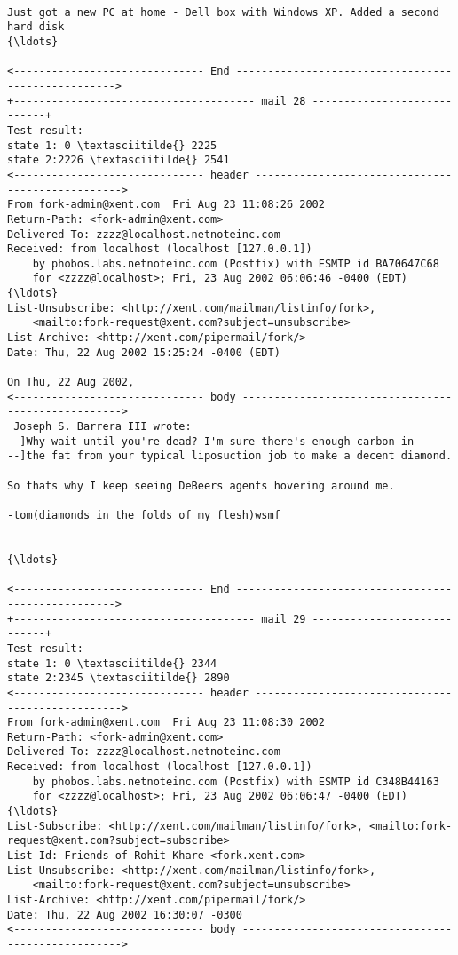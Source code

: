 \documentclass[11pt]{article}
\begin{document}
\begin{Verbatim}[commandchars=\\\{\}]
 
Just got a new PC at home - Dell box with Windows XP. Added a second hard disk
{\ldots}

<------------------------------ End --------------------------------------------------->
+-------------------------------------- mail 28 ----------------------------+
Test result:
state 1: 0 \textasciitilde{} 2225
state 2:2226 \textasciitilde{} 2541
<------------------------------ header ------------------------------------------------->
From fork-admin@xent.com  Fri Aug 23 11:08:26 2002
Return-Path: <fork-admin@xent.com>
Delivered-To: zzzz@localhost.netnoteinc.com
Received: from localhost (localhost [127.0.0.1])
	by phobos.labs.netnoteinc.com (Postfix) with ESMTP id BA70647C68
	for <zzzz@localhost>; Fri, 23 Aug 2002 06:06:46 -0400 (EDT)
{\ldots}
List-Unsubscribe: <http://xent.com/mailman/listinfo/fork>,
    <mailto:fork-request@xent.com?subject=unsubscribe>
List-Archive: <http://xent.com/pipermail/fork/>
Date: Thu, 22 Aug 2002 15:25:24 -0400 (EDT)

On Thu, 22 Aug 2002,
<------------------------------ body --------------------------------------------------->
 Joseph S. Barrera III wrote:
--]Why wait until you're dead? I'm sure there's enough carbon in
--]the fat from your typical liposuction job to make a decent diamond.

So thats why I keep seeing DeBeers agents hovering around me.

-tom(diamonds in the folds of my flesh)wsmf


{\ldots}

<------------------------------ End --------------------------------------------------->
+-------------------------------------- mail 29 ----------------------------+
Test result:
state 1: 0 \textasciitilde{} 2344
state 2:2345 \textasciitilde{} 2890
<------------------------------ header ------------------------------------------------->
From fork-admin@xent.com  Fri Aug 23 11:08:30 2002
Return-Path: <fork-admin@xent.com>
Delivered-To: zzzz@localhost.netnoteinc.com
Received: from localhost (localhost [127.0.0.1])
	by phobos.labs.netnoteinc.com (Postfix) with ESMTP id C348B44163
	for <zzzz@localhost>; Fri, 23 Aug 2002 06:06:47 -0400 (EDT)
{\ldots}
List-Subscribe: <http://xent.com/mailman/listinfo/fork>, <mailto:fork-request@xent.com?subject=subscribe>
List-Id: Friends of Rohit Khare <fork.xent.com>
List-Unsubscribe: <http://xent.com/mailman/listinfo/fork>,
    <mailto:fork-request@xent.com?subject=unsubscribe>
List-Archive: <http://xent.com/pipermail/fork/>
Date: Thu, 22 Aug 2002 16:30:07 -0300
<------------------------------ body --------------------------------------------------->


\end{Verbatim}
\end{document}
